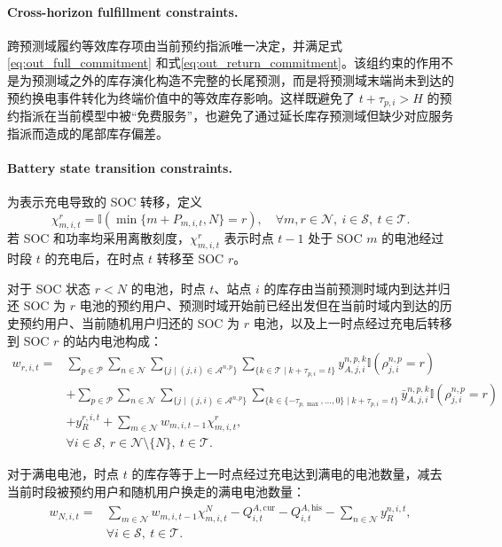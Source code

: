 \documentclass[12pt,hyperref,a4paper,UTF8]{ctexart}
\begin{document}
\paragraph{Cross-horizon fulfillment constraints.}
跨预测域履约等效库存项由当前预约指派唯一决定，并满足式\eqref{eq:out_full_commitment} 和式\eqref{eq:out_return_commitment}。该组约束的作用不是为预测域之外的库存演化构造不完整的长尾预测，而是将预测域末端尚未到达的预约换电事件转化为终端价值中的等效库存影响。这样既避免了 $t+\tau_{p,i}>H$ 的预约指派在当前模型中被“免费服务”，也避免了通过延长库存预测域但缺少对应服务指派而造成的尾部库存偏差。

\paragraph{Battery state transition constraints.}
为表示充电导致的 SOC 转移，定义
\begin{equation}
\chi_{m,i,t}^{r}=\mathbb{I}\!\left(\min\{m+P_{m,i,t},N\}=r\right),
\quad \forall m,r\in\mathcal{N},\ i\in\mathcal{S},\ t\in\mathcal{T}.
\label{eq:charging_indicator}
\end{equation}
若 SOC 和功率均采用离散刻度，$\chi_{m,i,t}^{r}$ 表示时点 $t-1$ 处于 SOC $m$ 的电池经过时段 $t$ 的充电后，在时点 $t$ 转移至 SOC $r$。

对于 SOC 状态 $r<N$ 的电池，时点 $t$、站点 $i$ 的库存由当前预测时域内到达并归还 SOC 为 $r$ 电池的预约用户、预测时域开始前已经出发但在当前时域内到达的历史预约用户、当前随机用户归还的 SOC 为 $r$ 电池，以及上一时点经过充电后转移到 SOC $r$ 的站内电池构成：
\begin{equation}
\begin{aligned}
w_{r,i,t}
=&
\sum_{p\in \mathcal{P}}
\sum_{n\in \mathcal{N}}
\sum_{\{j\mid (j,i)\in \mathcal{A}^{n,p}\}}
\sum_{\{k\in \mathcal{T}\mid k+\tau_{p,i}=t\}}
y_{A,j,i}^{n,p,k}
\mathbb{I}\!\left(\rho_{j,i}^{n,p}=r\right)
\\
&+
\sum_{p\in \mathcal{P}}
\sum_{n\in \mathcal{N}}
\sum_{\{j\mid (j,i)\in \mathcal{A}^{n,p}\}}
\sum_{\{k\in\{-\tau_{p,\max},\ldots,0\}\mid k+\tau_{p,i}=t\}}
\bar{y}_{A,j,i}^{n,p,k}
\mathbb{I}\!\left(\rho_{j,i}^{n,p}=r\right)
\\
&+
y_R^{r,i,t}
+
\sum_{m\in \mathcal{N}}
w_{m,i,t-1}\chi_{m,i,t}^{r},
\\
&\forall i\in \mathcal{S},\ r\in \mathcal{N}\setminus\{N\},\ t\in \mathcal{T}.
\end{aligned}
\label{eq:transition_nonfull}
\end{equation}

对于满电电池，时点 $t$ 的库存等于上一时点经过充电达到满电的电池数量，减去当前时段被预约用户和随机用户换走的满电电池数量：
\begin{equation}
\begin{aligned}
w_{N,i,t}
=&
\sum_{m\in \mathcal{N}}
w_{m,i,t-1}\chi_{m,i,t}^{N}
-
Q_{i,t}^{A,\mathrm{cur}}
-
Q_{i,t}^{A,\mathrm{his}}
-
\sum_{n\in \mathcal{N}}y_R^{n,i,t},
\\
&\forall i\in \mathcal{S},\ t\in \mathcal{T}.
\end{aligned}
\label{eq:transition_full}
\end{equation}
\end{document}
